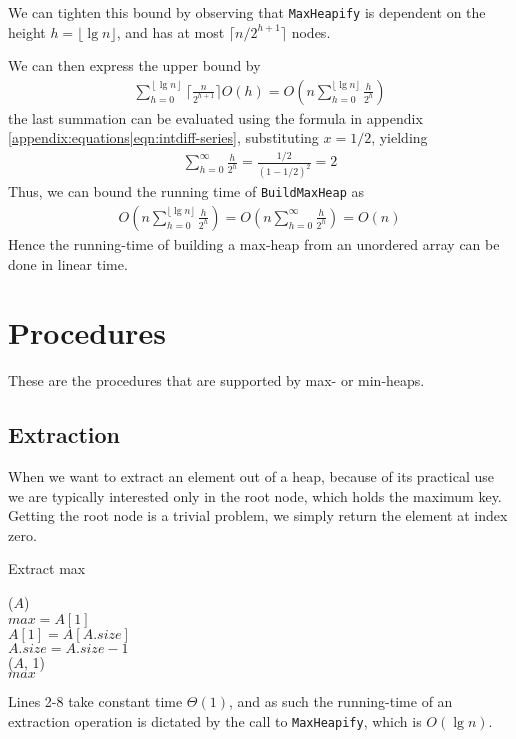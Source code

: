 We can tighten this bound by observing that \texttt{MaxHeapify} is dependent
on the height $h = \lfloor \lg n \rfloor$, and has at most $\lceil n/2^{h+1}
\rceil$ nodes.

We can then express the upper bound by
\begin{align}
	\sum_{h=0}^{\left\lfloor \lg n \right\rfloor}
	\lceil \frac {n}{2^{h+1}} \rceil O(h) =
	O \left( n \sum_{h=0}^{\lfloor \lg n \rfloor} \frac{h}{2^h} \right)
\end{align}
the last summation can be evaluated using the formula in appendix
\ref{appendix:equations|eqn:intdiff-series}, substituting $x = 1/2$, yielding
\begin{align}
	\sum_{h=0}^{\infty} \frac{h}{2^h} = \frac{1/2}{(1 - 1/2)^2} = 2
\end{align}
Thus, we can bound the running time of \texttt{BuildMaxHeap} as
\begin{align}
	O \left( n \sum_{h=0}^{\lfloor \lg n \rfloor} \frac{h}{2^h} \right) =
	O \left( n \sum_{h=0}^{\infty} \frac{h}{2^h} \right) = O(n)
\end{align}
Hence the running-time of building a max-heap from an unordered array can be
done in linear time.

\newpage

\section{Procedures}
\label{ch:heaps|sec:procedures}
These are the procedures that are supported by max- or min-heaps.

\subsection{Extraction}
\label{ch:heaps|sec:procedures|sub:extraction}
When we want to extract an element out of a heap, because of its practical use
we are typically interested only in the root node, which holds the maximum
key. Getting the root node is a trivial problem, we simply return the element
at index zero. \\
\begin{algorithm}[H]
	\caption{Extract max}
	\label{alg:heap-extract-max}
	
	
	
	
	
	\BlankLine
	\ExtractMax($A$) \\
	\Begin
	{
		$max = A[1]$ \\
		$A[1] = A[A.size]$ \\
		$A.size = A.size - 1$ \\
		\MaxHeapify($A$, 1) \\
		\Return $max$
	}
\end{algorithm}
Lines 2-8 take constant time $\Theta(1)$, and as such the running-time of an
extraction operation is dictated by the call to \texttt{MaxHeapify}, which is
$O(\lg n)$.

